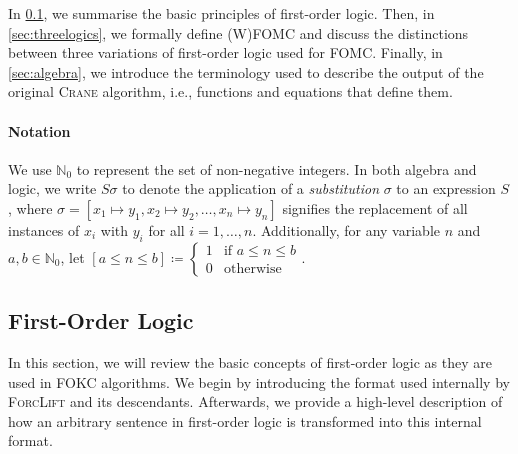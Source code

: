 \documentclass[a4paper,UKenglish,cleveref, autoref, thm-restate]{lipics-v2021}
\begin{document}

In \cref{sec:logic}, we summarise the basic principles of first-order logic.
Then, in \cref{sec:threelogics}, we formally define (W)FOMC and discuss the
distinctions between three variations of first-order logic used for FOMC.\@
Finally, in \cref{sec:algebra}, we introduce the terminology used to describe
the output of the original \textsc{Crane} algorithm, i.e., functions and
equations that define them.

\paragraph*{Notation}
We use $\mathbb{N}_{0}$ to represent the set of non-negative integers. In both
algebra and logic, we write $S\sigma$ to denote the application of a
\emph{substitution} $\sigma$ to an expression $S$, where
$\sigma = [x_{1} \mapsto y_{1}, x_{2} \mapsto y_{2}, \dots, x_{n} \mapsto y_{n}]$
signifies the replacement of all instances of $x_{i}$ with $y_{i}$ for all
$i = 1, \dots, n$. Additionally, for any variable $n$ and
$a, b \in \mathbb{N}_{0}$, let $[a \le n \le b] \coloneqq \begin{cases}
  1 & \text{if $a \le n \le b$} \\
  0 & \text{otherwise}
\end{cases}$.

\subsection{First-Order Logic}\label{sec:logic}

In this section, we will review the basic concepts of first-order logic as they
are used in FOKC algorithms. We begin by introducing the format used internally
by \textsc{ForcLift} and its descendants. Afterwards, we provide a high-level
description of how an arbitrary sentence in first-order logic is transformed
into this internal format.
\end{document}
